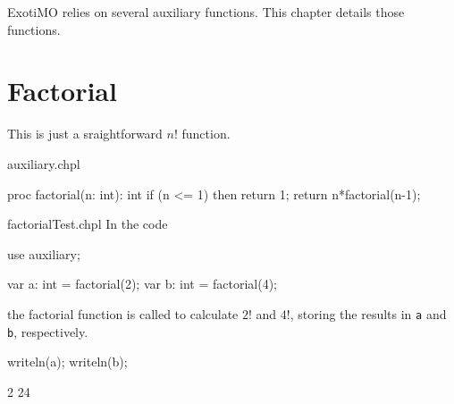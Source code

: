 \label{Auxiliary_Functions}

ExotiMO relies on several auxiliary functions. This chapter details those functions.

\section{Factorial}
This is just a sraightforward $n!$ function.
\begin{chapelsource}{auxiliary.chpl}
\begin{chapel}
proc factorial(n: int): int{
  if (n <= 1) then return 1;
  return n*factorial(n-1);
}
\end{chapel}
\end{chapelsource}

\begin{chapelexample}{factorialTest.chpl}
In the code
\begin{chapelpre}
use auxiliary;
\end{chapelpre}
\begin{chapel}
var a: int = factorial(2);
var b: int = factorial(4);
\end{chapel}
the factorial function is called to calculate $2!$ and $4!$, storing the results in \lstinline{a}
and \lstinline{b}, respectively.
\begin{chapelpost}
writeln(a);
writeln(b);
\end{chapelpost}
\begin{chapeloutput}
2
24
\end{chapeloutput}
\end{chapelexample}


